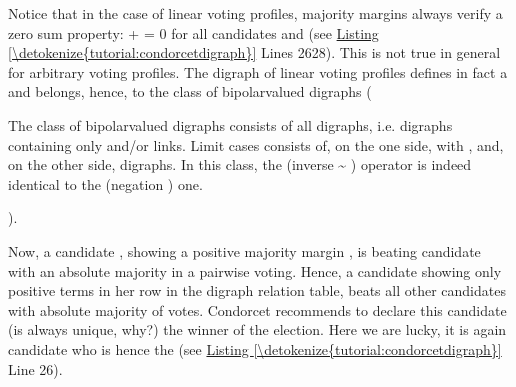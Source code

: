 \documentclass[a4paper,12pt,english]{sphinxhowto}
\begin{document}
Notice that in the case of linear voting profiles, majority margins always verify a zero sum property:  +  = 0 for all candidates  and  (see \hyperref[\detokenize{tutorial:condorcetdigraph}]{Listing \ref{\detokenize{tutorial:condorcetdigraph}}} Lines 26\sphinxhyphen{}28). This is not true in general for arbitrary voting profiles. The  digraph of linear voting profiles defines in fact a  and belongs, hence, to the class of  bipolar\sphinxhyphen{}valued digraphs (%
\begin{footnote}[13]\sphinxAtStartFootnote
The class of  bipolar\sphinxhyphen{}valued digraphs consists of all  digraphs, i.e. digraphs containing only  and/or  links. Limit cases consists of, on the one side,  with , and, on the other side,  digraphs. In this class, the  (inverse \textasciitilde{} ) operator is indeed identical to the  (negation \sphinxhyphen{} ) one.
%
\end{footnote}).

Now, a candidate , showing a positive majority margin , is beating candidate   with an absolute majority in a pairwise voting. Hence, a candidate showing only positive terms in her row in the  digraph relation table, beats all other candidates with absolute majority of votes. Condorcet recommends to declare this candidate (is always unique, why?) the winner of the election. Here we are lucky, it is again candidate  who is hence the  (see \hyperref[\detokenize{tutorial:condorcetdigraph}]{Listing \ref{\detokenize{tutorial:condorcetdigraph}}} Line 26).

\begin{sphinxVerbatim}[commandchars=\\\{\},numbers=left,firstnumber=1,stepnumber=1]
\end{sphinxVerbatim}
\end{document}
